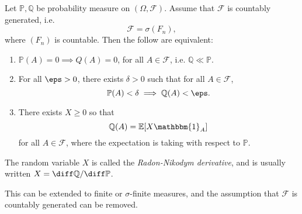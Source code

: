 \documentclass[12pt]{article}
\begin{document}
\begin{theorem}
	Let $\mathbb{P}, \mathbb{Q}$ be probability measure on $(\Omega, \mathcal{F})$. Assume that $\mathcal{F}$ is countably generated, i.e.
	\[
	\mathcal{F} = \sigma(F_n),
	\]
	where $(F_n)$ is countable. Then the follow are equivalent:
	\begin{enumerate}[\normalfont(i)]
		\item $\mathbb{P}(A) = 0 \implies Q(A) = 0$, for all $A \in \mathcal{F}$, i.e. $\mathbb{Q} \ll \mathbb{P}$.
		\item For all $\eps > 0$, there exists $\delta > 0$ such that for all $A \in \mathcal{F}$,
			\[
			\mathbb{P}(A) < \delta \implies \mathbb{Q}(A) < \eps.
			\]
		\item There exists $X \geq 0$ so that
			\[
			\mathbb{Q}(A) = \mathbb{E}[X \mathbbm{1}_{A}]
			\]
			for all $A \in \mathcal{F}$, where the expectation is taking with respect to $\mathbb{P}$.
	\end{enumerate}	
\end{theorem}

The random variable $X$ is called the \emph{Radon-Nikodym derivative}, and is usually written $X = \diff \mathbb{Q} / \diff \mathbb{P}$.

This can be extended to finite or $\sigma$-finite measures, and the assumption that $\mathcal{F}$ is countably generated can be removed.
\end{document}
